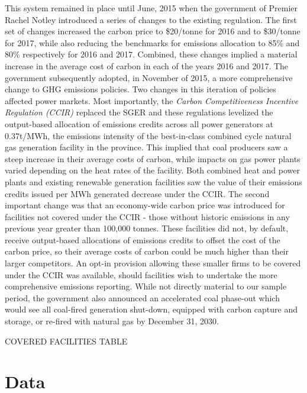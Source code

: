 \documentclass[12pt]{article}
\begin{document}
This system remained in place until June, 2015 when the government of Premier Rachel Notley introduced a series of changes to the existing regulation. The first set of changes increased the carbon price to \$20/tonne for 2016 and to \$30/tonne for 2017, while also reducing the benchmarks for emissions allocation to 85\% and 80\% respectively for 2016 and 2017. Combined, these changes implied a material increase in the average cost of carbon in each of the years 2016 and 2017. The government subsequently adopted, in November of 2015, a more comprehensive change to GHG emissions policies. Two changes in this iteration of policies affected power markets.  Most importantly, the \textit{Carbon Competitiveness Incentive Regulation (CCIR)} replaced the SGER and these regulations levelized the output-based allocation of emissions credits across all power generators at 0.37t/MWh, the emissions intensity of the best-in-class combined cycle natural gas generation facility in the province. This implied that coal producers saw a steep increase in their average costs of carbon, while impacts on gas power plants varied depending on the heat rates of the facility. Both combined heat and power plants and existing renewable generation facilities saw the value of their emissions credits issued per MWh generated decrease under the CCIR. The second important change was that an economy-wide carbon price was introduced for facilities not covered under the CCIR - those without historic emissions in any previous year greater than 100,000 tonnes. These facilities did not, by default, receive output-based allocations of emissions credits to offset the cost of the carbon price, so their average costs of carbon could be much higher than their larger competitors.  An opt-in provision allowing these smaller firms to be covered under the CCIR was available, should facilities wish to undertake the more comprehensive emissions reporting. While not directly material to our sample period, the government also announced an accelerated coal phase-out which would see all coal-fired generation shut-down, equipped with carbon capture and storage, or re-fired with natural gas by December 31, 2030.

COVERED FACILITIES TABLE

\section{Data}
\end{document}
